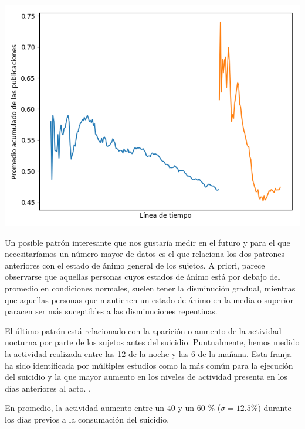 \documentclass[12pt, man, donotrepeattitle, letterpaper]{apa6}
\begin{document}
    \begin{center}
        \begin{minipage}{0.65\linewidth}
            \includegraphics[width=\linewidth]{images/mix}
        \end{minipage}
    \end{center}

    Un posible patrón interesante que nos gustaría medir en el futuro y para el que necesitaríamos un número mayor de datos es el que relaciona los dos patrones anteriores con el estado de ánimo general de los sujetos. A priori, parece observarse que aquellas personas cuyos estados de ánimo está por debajo del promedio en condiciones normales, suelen tener la disminución gradual, mientras que aquellas personas que mantienen un estado de ánimo en la media o superior paracen ser más suceptibles a las disminuciones repentinas.
    
    El último patrón está relacionado con la aparición o aumento de la actividad nocturna por parte de los sujetos antes del suicidio. Puntualmente, hemos medido la actividad realizada entre las 12 de la noche y las 6 de la mañana. Esta franja ha sido identificada por múltiples estudios como la más común para la ejecución del suicidio y la que mayor aumento en los niveles de actividad presenta en los días anteriores al acto. \parencite{Season} \parencite{Littlewoode012113} \parencite{Sleeping} \parencite{PERLIS2016101}.
    
    En promedio, la actividad aumento entre un 40 y un 60 \% ($\sigma = 12.5\%$) durante los días previos a la consumación del suicidio.
    
\end{document}
